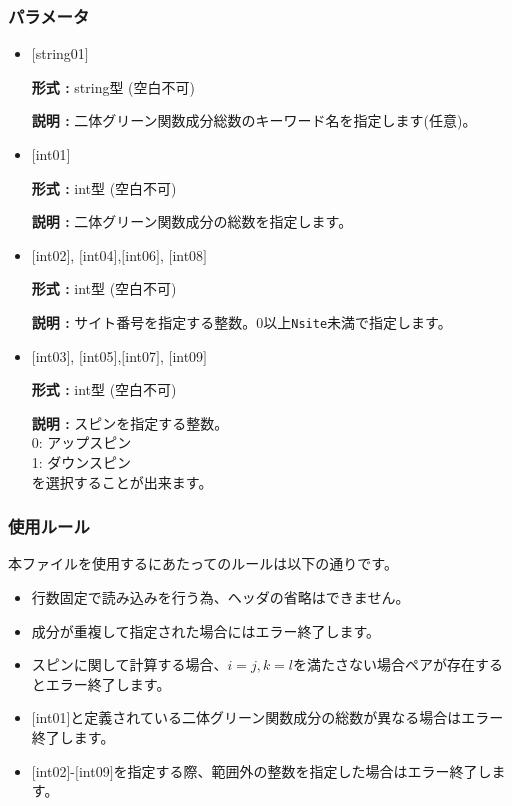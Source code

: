 \subsubsection{パラメータ}
 \begin{itemize}

   \item  $[$string01$]$
   
    {\bf 形式 :} string型 (空白不可)

   {\bf 説明 :} 二体グリーン関数成分総数のキーワード名を指定します(任意)。

   \item  $[$int01$]$
   
    {\bf 形式 :} int型 (空白不可)

   {\bf 説明 :} 二体グリーン関数成分の総数を指定します。

  \item  $[$int02$]$, $[$int04$]$,$[$int06$]$, $[$int08$]$

 {\bf 形式 :} int型 (空白不可)

{\bf 説明 :} サイト番号を指定する整数。0以上\verb|Nsite|{未満}で指定します。
 
  \item  $[$int03$]$, $[$int05$]$,$[$int07$]$, $[$int09$]$

 {\bf 形式 :} int型 (空白不可)

{\bf 説明 :} スピンを指定する整数。\\
0: アップスピン\\
1: ダウンスピン\\
を選択することが出来ます。

\end{itemize}

\subsubsection{使用ルール}
本ファイルを使用するにあたってのルールは以下の通りです。
\begin{itemize}
\item 行数固定で読み込みを行う為、ヘッダの省略はできません。
\item 成分が重複して指定された場合にはエラー終了します。
\item {スピンに関して計算する場合、$i=j, k=l$を満たさない場合ペアが存在するとエラー終了します。}
\item $[$int01$]$と定義されている二体グリーン関数成分の総数が異なる場合はエラー終了します。
\item $[$int02$]$-$[$int09$]$を指定する際、範囲外の整数を指定した場合はエラー終了します。
\end{itemize}

